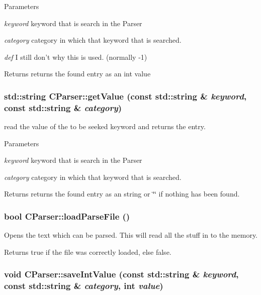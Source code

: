 \begin{DoxyParams}{Parameters}
\item[{\em keyword}]keyword that is search in the Parser \item[{\em category}]category in which that keyword that is searched. \item[{\em def}]I still don't why this is used. (normally -\/1) \end{DoxyParams}
\begin{DoxyReturn}{Returns}
returns the found entry as an int value 
\end{DoxyReturn}
\hypertarget{class_c_parser_a6f35de18dba3a8f5bf0aa45ca1692161}{
\subsubsection[{getValue}]{\setlength{\rightskip}{0pt plus 5cm}std::string CParser::getValue (const std::string \& {\em keyword}, \/  const std::string \& {\em category})}}
\label{class_c_parser_a6f35de18dba3a8f5bf0aa45ca1692161}


read the value of the to be seeked keyword and returns the entry. 


\begin{DoxyParams}{Parameters}
\item[{\em keyword}]keyword that is search in the Parser \item[{\em category}]category in which that keyword that is searched. \end{DoxyParams}
\begin{DoxyReturn}{Returns}
returns the found entry as an string or \char`\"{}\char`\"{} if nothing has been found. 
\end{DoxyReturn}
\hypertarget{class_c_parser_a0b7c44198349162fd944a285d164a57c}{
\subsubsection[{loadParseFile}]{\setlength{\rightskip}{0pt plus 5cm}bool CParser::loadParseFile ()}}
\label{class_c_parser_a0b7c44198349162fd944a285d164a57c}


Opens the text which can be parsed. This will read all the stuff in to the memory. 

\begin{DoxyReturn}{Returns}
true if the file was correctly loaded, else false. 
\end{DoxyReturn}
\hypertarget{class_c_parser_a55aa335048e89a9758b87e8ed8be14ce}{
\subsubsection[{saveIntValue}]{\setlength{\rightskip}{0pt plus 5cm}void CParser::saveIntValue (const std::string \& {\em keyword}, \/  const std::string \& {\em category}, \/  int {\em value})}}
\label{class_c_parser_a55aa335048e89a9758b87e8ed8be14ce}


